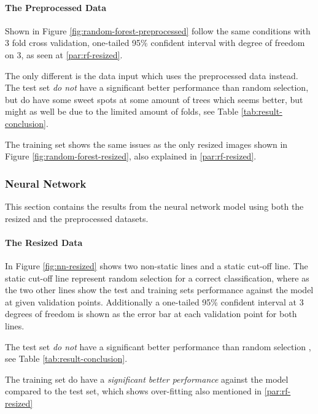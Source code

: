 \paragraph{The Preprocessed Data}
Shown in Figure \ref{fig:random-forest-preprocessed} follow the same conditions with 3 fold cross validation, one-tailed 95\% confident interval with degree of freedom on 3, as seen at \ref{par:rf-resized}.

The only different is the data input which uses the preprocessed data instead.
The test set \emph{do not} have a significant better performance than random selection, but do have some sweet spots at some amount of trees which seems better, but might as well be due to the limited amount of folds, see Table \ref{tab:result-conclusion}.

The training set shows the same issues as the only resized images shown in Figure \ref{fig:random-forest-resized}, also explained in \ref{par:rf-resized}.

\subsubsection{Neural Network}
\label{subsubsec:neuralnetwork}
This section contains the results from the neural network model using both the resized and the preprocessed datasets.

\paragraph{The Resized Data}
In Figure \ref{fig:nn-resized} shows two non-static lines and a static cut-off line.
The static cut-off line represent random selection for a correct classification, where as the two other lines show the test and training sets performance against the model at given validation points. Additionally a one-tailed 95\% confident interval at 3 degrees of freedom is shown as the error bar at each validation point for both lines.

The test set \emph{do not} have a significant better performance than random selection
, see Table \ref{tab:result-conclusion}.

The training set do have a \emph{significant better performance} against the model compared to the test set, which shows over-fitting also mentioned in \ref{par:rf-resized}


